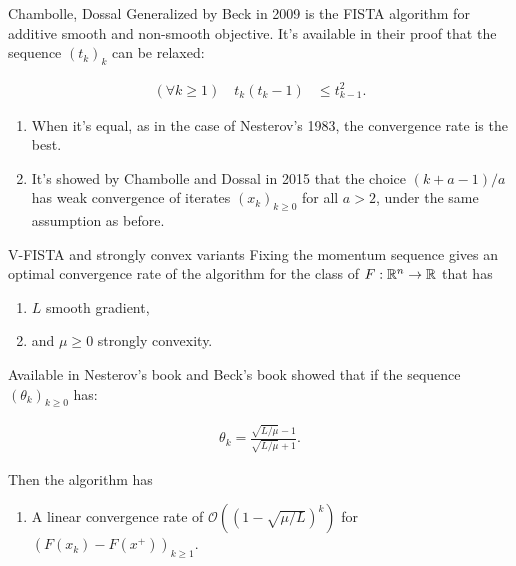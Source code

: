 \documentclass[11pt]{beamer}
\theoremstyle{definition}
\begin{document}
        \begin{frame}{Chambolle, Dossal}
            Generalized by Beck \cite{beck_fast_2009-1} in 2009 is the FISTA algorithm for additive smooth and non-smooth objective. 
            It's available in their proof that the sequence $(t_k)_{k}$ can be relaxed: 
            \begin{tcolorbox}\noindent\vspace{-1em}
                \begin{align*}
                    (\forall k \ge 1)\quad t_k (t_k - 1) &\le t_{k - 1}^2. 
                \end{align*}    
            \end{tcolorbox}
            \begin{enumerate}
                \item When it's equal, as in the case of Nesterov's 1983, the convergence rate is the best. 
                \item It's showed by Chambolle and Dossal in 2015 \cite{chambolle_convergence_2015} that the choice $(k + a -1)/a$ has weak convergence of iterates $(x_k)_{k \ge 0}$ for all $a > 2$, under the same assumption as before. 
            \end{enumerate}
        \end{frame}
        \begin{frame}{V-FISTA and strongly convex variants}
            Fixing the momentum sequence gives an optimal convergence rate of the algorithm for the class of $F:\mathbb R^n \rightarrow \mathbb R$ that has 
            \begin{enumerate}
                \item $L$ smooth gradient, 
                \item and $\mu \ge 0$ strongly convexity. 
            \end{enumerate}
            Available in Nesterov's book \cite{nesterov_lectures_2018} and Beck's book \cite{beck_first-order_2017} showed that if the sequence $(\theta_k)_{k\ge 0}$ has: 
            \begin{tcolorbox}
                \begin{align*}
                   \theta_k = \frac{\sqrt{L/\mu} - 1}{\sqrt{L/\mu} + 1}. 
                \end{align*}
            \end{tcolorbox}
            Then the algorithm has
            \begin{enumerate}
                \item A linear convergence rate of $\mathcal O((1 - \sqrt{\mu/L})^k)$ for $(F(x_k) - F(x^+))_{k \ge 1}$. 
            \end{enumerate}
        \end{frame}
\end{document}
